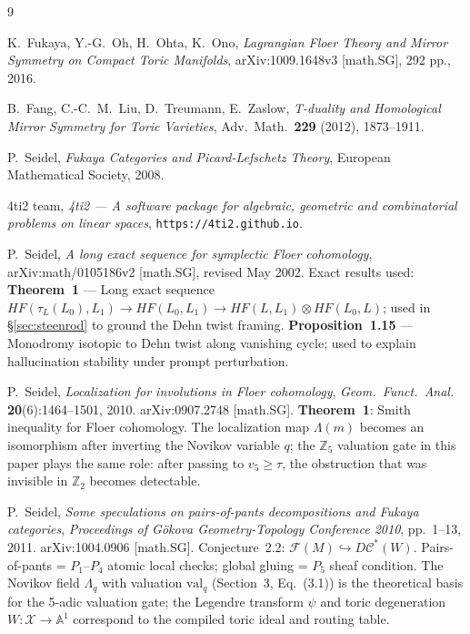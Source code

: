 \documentclass[11pt,a4paper]{article}
\begin{document}
\begin{thebibliography}{9}

  K.~Fukaya, Y.-G.~Oh, H.~Ohta, K.~Ono,
  \emph{Lagrangian Floer Theory and Mirror Symmetry on Compact
  Toric Manifolds},
  arXiv:1009.1648v3 [math.SG], 292 pp., 2016.

  B.~Fang, C.-C.~M.~Liu, D.~Treumann, E.~Zaslow,
  \emph{T-duality and Homological Mirror Symmetry for Toric Varieties},
  Adv.\ Math.\ \textbf{229} (2012), 1873--1911.

  P.~Seidel,
  \emph{Fukaya Categories and Picard-Lefschetz Theory},
  European Mathematical Society, 2008.

  4ti2 team,
  \emph{4ti2 --- A software package for algebraic, geometric and
  combinatorial problems on linear spaces},
  \texttt{https://4ti2.github.io}.


  P.~Seidel,
  \emph{A long exact sequence for symplectic Floer cohomology},
  arXiv:math/0105186v2 [math.SG], revised May 2002.
  \newline
  Exact results used:
  \textbf{Theorem~1} --- Long exact sequence
    $HF(\tau_L(L_0),L_1)\to HF(L_0,L_1)\to HF(L,L_1)\otimes HF(L_0,L)$;
    used in \S\ref{sec:steenrod} to ground the Dehn twist framing.
  \textbf{Proposition~1.15} --- Monodromy isotopic to Dehn twist along
    vanishing cycle; used to explain hallucination stability under
    prompt perturbation.

  P.~Seidel,
  \emph{Localization for involutions in Floer cohomology},
  \emph{Geom.\ Funct.\ Anal.} \textbf{20}(6):1464--1501, 2010.
  arXiv:0907.2748 [math.SG].
  \newline
  \textbf{Theorem~1}: Smith inequality for Floer cohomology.
  The localization map $\Lambda(m)$ becomes an isomorphism after inverting
  the Novikov variable $q$; the $\mathbb{Z}_5$ valuation gate in this
  paper plays the same role: after passing to $v_5 \geq \tau$, the
  obstruction that was invisible in $\mathbb{Z}_2$ becomes detectable.

  P.~Seidel,
  \emph{Some speculations on pairs-of-pants decompositions and Fukaya categories},
  \emph{Proceedings of G\"okova Geometry-Topology Conference 2010},
  pp.~1--13, 2011. arXiv:1004.0906 [math.SG].
  \newline
  Conjecture~2.2: $\mathcal{F}(M)\hookrightarrow D\mathcal{C}^*(W)$.
  Pairs-of-pants = $P_1$--$P_4$ atomic local checks;
  global gluing = $P_5$ sheaf condition.
  The Novikov field $\Lambda_q$ with valuation $\mathrm{val}_q$
  (Section~3, Eq.~(3.1)) is the theoretical basis for the
  5-adic valuation gate; the Legendre transform $\psi$ and
  toric degeneration $W:\mathcal{X}\to\mathbb{A}^1$ correspond
  to the compiled toric ideal and routing table.


\end{thebibliography}
\end{document}
